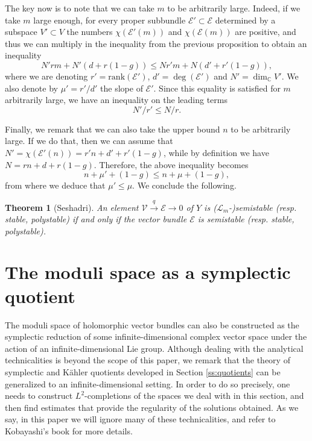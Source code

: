 \documentclass[12pt,a4paper]{amsbook}
\newtheorem{thm}{Theorem}[chapter]
\theoremstyle{remark} \newtheorem{rmk}[thm]{Remark}
\theoremstyle{definition} \newtheorem{defn}[thm]{Definition}
\theoremstyle{definition} \newtheorem{ex}[thm]{Example}
\theoremstyle{definition} \newtheorem{ej}{Exercise}
\newcommand{\C}{\mathbb C}
\newcommand{\sE}{\mathscr E}
\newcommand{\sL}{\mathscr L}
\newcommand{\sV}{\mathscr V}
\begin{document}
The key now is to note that we can take $m$ to be arbitrarily large. Indeed, if we take $m$ large enough, for every proper subbundle $\sE'\subset \sE$ determined by a subspace $V'\subset V$ the numbers $\chi(\sE'(m))$ and $\chi(\sE(m))$ are positive, and thus we can multiply in the inequality from the previous proposition to obtain an inequality
\begin{equation*}
N' r  m + N' (d + r(1-g)) \leq N r' m + N(d' + r' (1-g)),
\end{equation*}
where we are denoting $r'=\mathrm{rank}(\sE')$, $d'=\deg(\sE')$ and $N'=\dim_\C V'$. We also denote by $\mu'=r'/d'$ the slope of $\sE'$. Since this equality is satisfied for $m$ arbitrarily large, we have an inequality on the leading terms
\begin{equation*}
N'/r' \leq N/r.
\end{equation*}

Finally, we remark that we can also take the upper bound $n$ to be arbitrarily large. If we do that, then we can assume that $N'=\chi(\sE'(n))= r'n + d' + r'(1-g)$, while by definition we have $N=rn+d+r(1-g)$. Therefore, the above inequality becomes
\begin{equation*}
n + \mu' + (1-g) \leq n + \mu + (1-g),
\end{equation*}
from where we deduce that $\mu' \leq \mu$. We conclude the following.

\begin{thm}[Seshadri]
An element $\sV \overset{q}{\rightarrow} \sE \rightarrow 0$ of $Y$ is ($\sL_m$-)semistable (resp. stable, polystable) if and only if the vector bundle $\sE$ is semistable (resp. stable, polystable).
\end{thm}

\section{The moduli space as a symplectic quotient}
The moduli space of holomorphic vector bundles can also be constructed as the symplectic reduction of some infinite-dimensional complex vector space under the action of an infinite-dimensional Lie group. Although dealing with the analytical technicalities is beyond the scope of this paper, we remark that the theory of symplectic and Kähler quotients developed in Section \ref{ss:quotients} can be generalized to an infinite-dimensional setting. In order to do so precisely, one needs to construct $L^2$-completions of the spaces we deal with in this section, and then find estimates that provide the regularity of the solutions obtained. As we say, in this paper we will ignore many of these technicalities, and refer to Kobayashi's book \cite{Kobayashi} for more details.
\end{document}

